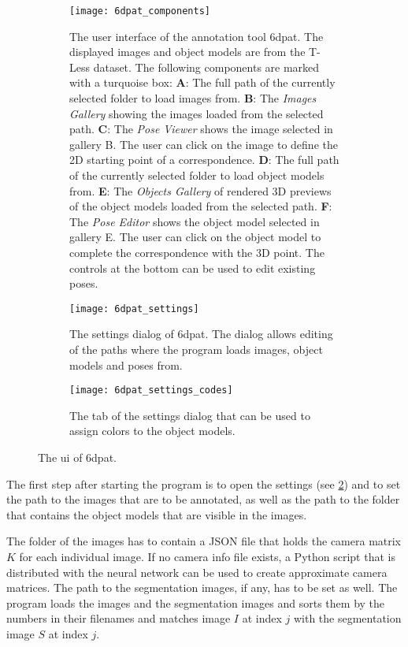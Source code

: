 \begin{figure}[!tbp]
	\centering
	\begin{subfigure}[t]{\textwidth}
		\centering
    	\texttt{[image: 6dpat\_components]}
    	\caption{The user interface of the annotation tool \ac{6dpat}. The displayed images and object models are from the T-Less dataset. The following components are marked with a turquoise box: \textbf{A}: The full path of the currently selected folder to load images from. \textbf{B}: The \textit{Images Gallery} showing the images loaded from the selected path. \textbf{C}: The \textit{Pose Viewer} shows the image selected in gallery B. The user can click on the image to define the 2D starting point of a correspondence. \textbf{D}: The full path of the currently selected folder to load object models from. \textbf{E}: The \textit{Objects Gallery} of rendered 3D previews of the object models loaded from the selected path. \textbf{F}: The \textit{Pose Editor} shows the object model selected in gallery E. The user can click on the object model to complete the correspondence with the 3D point. The controls at the bottom can be used to edit existing poses.}
    	\label{fig:6dpat_components}
	\end{subfigure}
	\par\bigskip
	\begin{subfigure}[t]{0.47\textwidth}
		\centering
    	\texttt{[image: 6dpat\_settings]}
    	\caption{The settings dialog of \ac{6dpat}. The dialog allows editing of the paths where the program loads images, object models and poses from.}
    	\label{fig:6dpat_settings}
	\end{subfigure}
	\hfill
	\begin{subfigure}[t]{0.47\textwidth}
	\centering
    	\texttt{[image: 6dpat\_settings\_codes]}
    	\caption{The tab of the settings dialog that can be used to assign colors to the object models.}
    	\label{fig:6dpat_settings_codes}
	\end{subfigure}
	\caption{The \ac{ui} of \ac{6dpat}.}
	\label{fig:6dpat_ui_overview}
\end{figure}

The first step after starting the program is to open the settings (see \fig \ref{fig:6dpat_settings}) and to set the path to the images that are to be annotated, as well as the path to the folder that contains the object models that are visible in the images. 

The folder of the images has to contain a JSON file that holds the camera matrix $K$ for each individual image. If no camera info file exists, a Python script that is distributed with the neural network can be used to create approximate camera matrices. The path to the segmentation images, if any, has to be set as well. The program loads the images and the segmentation images and sorts them by the numbers in their filenames and matches image $I$ at index $j$ with the segmentation image $S$ at index $j$. 

